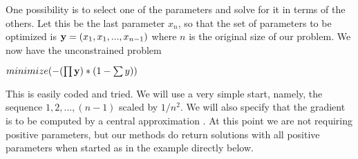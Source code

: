 \documentclass[11pt]{article}\usepackage[]{graphicx}\usepackage[]{color}
\newcommand{\B}[1]{{\bf #1 \rm}}
\begin{document}
One possibility is to select one of the parameters and solve for it in 
terms of the others. Let this
be the last parameter $x_n$, so that the set of parameters to be 
optimized is $ \B{y} = (x_1, x_1, ..., x_{n-1})$ where 
$n$ is the original size of our problem. We now have the unconstrained problem
\vspace*{10pt}

$ minimize ( - (\prod{\B{y}}) * (1 - \sum{y} ) ) $

\vspace*{10pt}
This is easily coded and tried. We will use a very simple start, namely, the sequence $1,2, ...,
(n-1)$ scaled by $1/n^2$. We will also specify that the gradient is to be computed by a 
central approximation \citep{optextras}. At this point we are not requiring positive
parameters, but our methods do return solutions with all positive parameters when started
as in the example directly below.
\end{document}
